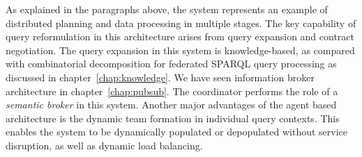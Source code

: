 As explained in the paragraphs above, the system represents an example of distributed planning and data processing in multiple 
stages. The key capability of query reformulation in this architecture arises from query expansion and contract negotiation. 
The query expansion in this system is knowledge-based, as compared with combinatorial decomposition for federated SPARQL
query processing as discussed in chapter~\ref{chap:knowledge}. We have seen information broker architecture in 
chapter~\ref{chap:pubsub}. The coordinator performs the role of a {\em semantic broker} in this system.
Another major advantages of the agent based architecture is the dynamic team formation in individual query contexts. This 
enables the system to be dynamically populated or depopulated without service disruption, as well as dynamic load balancing.


